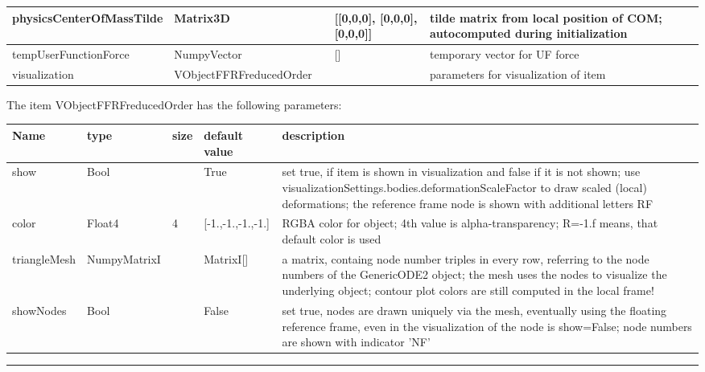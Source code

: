 \begin{center}
\begin{longtable}{| p{4.5cm} | p{2.5cm} | p{0.5cm} | p{2.5cm} | p{6cm} |}
    physicsCenterOfMassTilde &     Matrix3D &      &     [[0,0,0], [0,0,0], [0,0,0]] &     tilde matrix from local position of COM; autocomputed during initialization\\ \hline
    tempUserFunctionForce &     NumpyVector &      &     [] &     temporary vector for UF force\\ \hline
    visualization & VObjectFFRFreducedOrder & & & parameters for visualization of item \\ \hline
	  \end{longtable}
	\end{center}
The item VObjectFFRFreducedOrder has the following parameters:\vspace{-1cm}\\ 
\begin{center}
  \footnotesize
  \begin{longtable}{| p{4.5cm} | p{2.5cm} | p{0.5cm} | p{2.5cm} | p{6cm} |}
    \hline
    \bf Name & \bf type & \bf size & \bf default value & \bf description \\ \hline
    show &     Bool &      &     True &     set true, if item is shown in visualization and false if it is not shown; use visualizationSettings.bodies.deformationScaleFactor to draw scaled (local) deformations; the reference frame node is shown with additional letters RF\\ \hline
    color &     Float4 &     4 &     [-1.,-1.,-1.,-1.] &     RGBA color for object; 4th value is alpha-transparency; R=-1.f means, that default color is used\\ \hline
    triangleMesh &     NumpyMatrixI &      &     MatrixI[] &     a matrix, containg node number triples in every row, referring to the node numbers of the GenericODE2 object; the mesh uses the nodes to visualize the underlying object; contour plot colors are still computed in the local frame!\\ \hline
    showNodes &     Bool &      &     False &     set true, nodes are drawn uniquely via the mesh, eventually using the floating reference frame, even in the visualization of the node is show=False; node numbers are shown with indicator 'NF'\\ \hline
	  \end{longtable}
	\end{center}
\par\noindent\rule{\textwidth}{0.4pt}
\label{description_ObjectFFRFreducedOrder}
